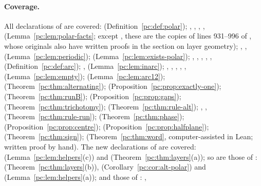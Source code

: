 \paragraph{Coverage.} All declarations of  are covered:
 (Definition~\ref{pc:def:polar}); , ,
, , 
(Lemma~\ref{pc:lem:polar-facts}; except , these are the copies of lines 931--996 of
, whose originals also have written proofs in the section on layer geometry);
,
,  (Lemma~\ref{pc:lem:periodic}); 
(Lemma~\ref{pc:lem:exists-polar}); , , , ,
,  (Definition~\ref{pc:def:arc}); , 
(Lemma~\ref{pc:lem:inarc}); , , , ,
,  (Lemma~\ref{pc:lem:empty}); 
(Lemma~\ref{pc:lem:arc12});  (Theorem~\ref{pc:thm:alternating});
 (Proposition~\ref{pc:prop:exactly-one}); 
(Theorem~\ref{pc:thm:runB});  (Proposition~\ref{pc:prop:gaps}); 
(Theorem~\ref{pc:thm:trichotomy});  (Theorem~\ref{pc:thm:rule-alt});
, , 
(Theorem~\ref{pc:thm:rule-run});  (Theorem~\ref{pc:thm:phase});
 (Proposition~\ref{pc:prop:centre}); 
(Proposition~\ref{pc:prop:halfplane});  (Theorem~\ref{pc:thm:sign});
 (Theorem~\ref{pc:thm:word}, computer-assisted in Lean; written proof by hand). The new declarations of
 are covered:  (Lemma~\ref{pc:lem:helpers}(c)) and
 (Theorem~\ref{pc:thm:layers}(a)); so are those of :
 (Theorem~\ref{pc:thm:layers}(b)), 
(Corollary~\ref{pc:cor:alt-polar}) and  (Lemma~\ref{pc:lem:helpers}(a)); and those of
: , 
